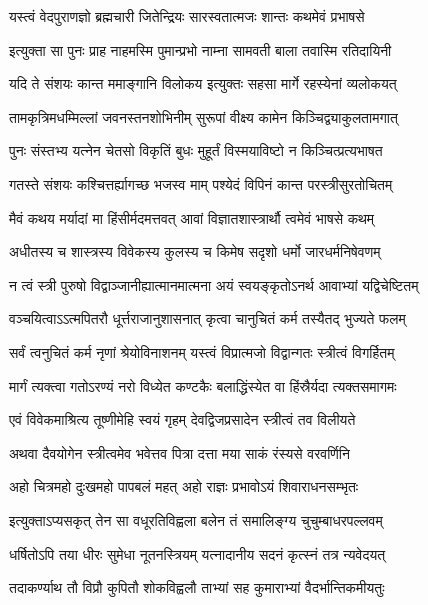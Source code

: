 \twolineshloka
{यस्त्वं वेदपुराणज्ञो ब्रह्मचारी जितेन्द्रियः}
{सारस्वतात्मजः शान्तः कथमेवं प्रभाषसे} %

\twolineshloka
{इत्युक्ता सा पुनः प्राह नाहमस्मि पुमान्प्रभो}
{नाम्ना सामवती बाला तवास्मि रतिदायिनी} %

\twolineshloka
{यदि ते संशयः कान्त ममाङ्गानि विलोकय}
{इत्युक्तः सहसा मार्गे रहस्येनां व्यलोकयत्} %

\twolineshloka
{तामकृत्रिमधम्मिल्लां जवनस्तनशोभिनीम्}
{सुरूपां वीक्ष्य कामेन किञ्चिद्व्याकुलतामगात्} %

\twolineshloka
{पुनः संस्तभ्य यत्नेन चेतसो विकृतिं बुधः}
{मुहूर्तं विस्मयाविष्टो न किञ्चित्प्रत्यभाषत} %

\twolineshloka
{गतस्ते संशयः कश्चित्तर्ह्यागच्छ भजस्व माम्}
{पश्येदं विपिनं कान्त परस्त्रीसुरतोचितम्} %

\twolineshloka
{मैवं कथय मर्यादां मा हिंसीर्मदमत्तवत्}
{आवां विज्ञातशास्त्रार्थौ त्वमेवं भाषसे कथम्} %

\twolineshloka
{अधीतस्य च शास्त्रस्य विवेकस्य कुलस्य च}
{किमेष सदृशो धर्मो जारधर्मनिषेवणम्} %

\twolineshloka
{न त्वं स्त्री पुरुषो विद्वाञ्जानीह्यात्मानमात्मना}
{अयं स्वयङ्कृतोऽनर्थ आवाभ्यां यद्विचेष्टितम्} %

\twolineshloka
{वञ्चयित्वाऽऽत्मपितरौ धूर्त्तराजानुशासनात्}
{कृत्वा चानुचितं कर्म तस्यैतद् भुज्यते फलम्} %

\twolineshloka
{सर्वं त्वनुचितं कर्म नृणां श्रेयोविनाशनम्}
{यस्त्वं विप्रात्मजो विद्वान्गतः स्त्रीत्वं विगर्हितम्} %

\twolineshloka
{मार्गं त्यक्त्वा गतोऽरण्यं नरो विध्येत कण्टकैः}
{बलाद्धिंस्येत वा हिंस्रैर्यदा त्यक्तसमागमः} %

\twolineshloka
{एवं विवेकमाश्रित्य तूष्णीमेहि स्वयं गृहम्}
{देवद्विजप्रसादेन स्त्रीत्वं तव विलीयते} %

\twolineshloka
{अथवा दैवयोगेन स्त्रीत्वमेव भवेत्तव}
{पित्रा दत्ता मया साकं रंस्यसे वरवर्णिनि} %

\twolineshloka
{अहो चित्रमहो दुःखमहो पापबलं महत्}
{अहो राज्ञः प्रभावोऽयं शिवाराधनसम्भृतः} %

\twolineshloka
{इत्युक्ताऽप्यसकृत् तेन सा वधूरतिविह्वला}
{बलेन तं समालिङ्ग्य चुचुम्बाधरपल्लवम्} %

\twolineshloka
{धर्षितोऽपि तया धीरः सुमेधा नूतनस्त्रियम्}
{यत्नादानीय सदनं कृत्स्नं तत्र न्यवेदयत्} %

\twolineshloka
{तदाकर्ण्याथ तौ विप्रौ कुपितौ शोकविह्वलौ}
{ताभ्यां सह कुमाराभ्यां वैदर्भान्तिकमीयतुः} %

